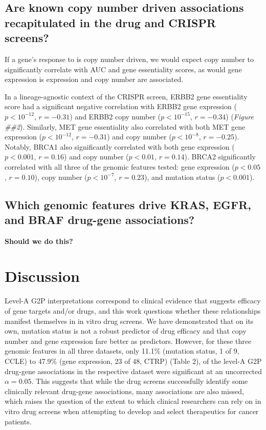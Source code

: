 \documentclass[man,floatsintext]{apa6}
\begin{document}
\subsection{Are known copy number driven associations recapitulated in
the drug and CRISPR
screens?}\label{are-known-copy-number-driven-associations-recapitulated-in-the-drug-and-crispr-screens}

If a gene's response to is copy number driven, we would expect copy
number to significantly correlate with AUC and gene essentiality scores,
as would gene expression is expression and copy number are associated.

In a lineage-agnostic context of the CRISPR screen, ERBB2 gene
essentiality score had a significant negative correlation with ERBB2
gene expression (\(p < 10^{-12}\), \(r = -0.31\)) and ERBB2 copy number
(\(p < 10^{-15}\), \(r = -0.34\)) (\emph{Figure \#\#2}). Similarly, MET
gene essentiality also correlated with both MET gene expression
(\(p < 10^{-12}\), \(r = -0.31\)) and copy number (\(p < 10^{-8}\),
\(r = -0.25\)). Notably, BRCA1 also significantly correlated with both
gene expression (\(p < 0.001\), \(r = 0.16\)) and copy number
(\(p < 0.01\), \(r = 0.14\)). BRCA2 significantly correlated with all
three of the genomic features tested: gene expression (\(p < 0.05\),
\(r = 0.10\)), copy number (\(p < 10^{-7}\), \(r = 0.23\)), and mutation
status (\(p < 0.001\)).

\subsection{Which genomic features drive KRAS, EGFR, and BRAF drug-gene
associations?}\label{which-genomic-features-drive-kras-egfr-and-braf-drug-gene-associations}

\textbf{Should we do this?}

\section{Discussion}\label{discussion}

Level-A G2P interpretations correspond to clinical evidence that
suggests efficacy of gene targets and/or drugs, and this work questions
whether these relationships manifest themselves in in vitro drug
screens. We have demonstrated that on its own, mutation status is not a
robust predictor of drug efficacy and that copy number and gene
expression fare better as predictors. However, for these three genomic
features in all three datasets, only 11.1\% (mutation status, 1 of 9,
CCLE) to 47.9\% (gene expression, 23 of 48, CTRP) (Table 2), of the
level-A G2P drug-gene associations in the respective dataset were
significant at an uncorrected \(\alpha = 0.05\). This suggests that
while the drug screens successfully identify some clinically relevant
drug-gene associations, many associations are also missed, which raises
the question of the extent to which clinical researchers can rely on in
vitro drug screens when attempting to develop and select therapeutics
for cancer patients.
\end{document}

